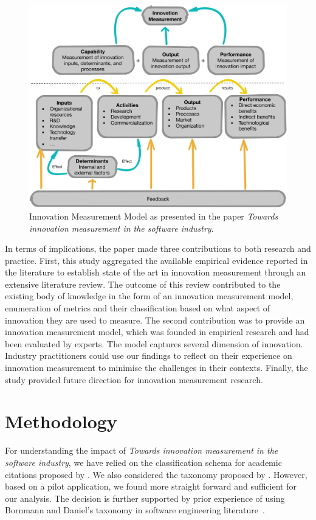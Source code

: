 \documentclass[sigconf,review]{acmart}
\newcommand{\theArticle}{\textit{Towards innovation measurement in the software industry}}
\begin{document}
\begin{figure}
\includegraphics[width=\columnwidth]{Figures/IM.pdf}
\caption{Innovation Measurement Model as presented in the paper \theArticle.}
\label{fig:im_model}
\end{figure}

In terms of implications, the paper made three contributions to both research and practice. First, this study aggregated the available empirical evidence reported in the literature to establish state of the art in innovation measurement through an extensive literature review. The outcome of this review contributed to the existing body of knowledge in the form of an innovation measurement model, enumeration of metrics and their classification based on what aspect of innovation they are used to measure. The second contribution was to provide an innovation measurement model, which was founded in empirical research and had been evaluated by experts. The model captures several dimension of innovation. Industry practitioners could use our findings to reflect on their experience on innovation measurement to minimise the challenges in their contexts. Finally, the study provided future direction for innovation measurement research.


\section{Methodology}\label{sec:method} %
For understanding the impact of \theArticle, we have relied on the classification schema for academic citations proposed by \citet{teufel2006annotation}. We also considered the taxonomy proposed by \citet{bornmann2008citation}. However, based on a pilot application, we found \citet{teufel2006annotation} more straight forward and sufficient for our analysis. The decision is further supported by prior experience of using Bornmann and Daniel's taxonomy in software engineering literature~\cite{poulding2015using}.
\end{document}
